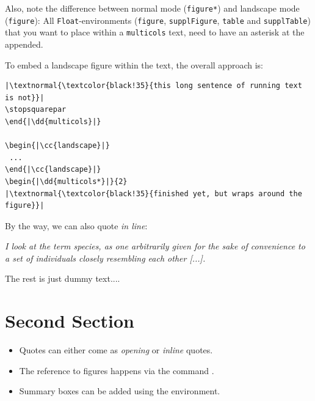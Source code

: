 \begin{multicols}{2}
Also, note the difference between normal mode (\texttt{figure*}) and landscape mode (\texttt{figure}):
All \texttt{Float}-environments (\texttt{figure}, \texttt{supplFigure}, \texttt{table} and \texttt{supplTable}) that you want to place within a \texttt{multicols} text, need to have an asterisk at the appended.

To embed a landscape figure within the text, the overall approach is:\vspace*{-.5em}

\coderule\vspace*{-.8em}
\begin{lstlisting}
|\textnormal{\textcolor{black!35}{this long sentence of running text is not}}|
\stopsquarepar
\end{|\dd{multicols}|}

\begin{|\cc{landscape}|}
 ...
\end{|\cc{landscape}|}
\begin{|\dd{multicols*}|}{2}
|\textnormal{\textcolor{black!35}{finished yet, but wraps around the figure}}|
\end{lstlisting}
\vspace*{-1.8em}
\coderule

By the way, we can also quote \textit{in line}:

\begin{displayquote}
\textit{
I look at the term species, as one arbitrarily given for the sake of convenience to a set of individuals closely resembling each other [...].}
\hfill{}
\end{displayquote}

The rest is just dummy text....

\lipsum[1]

\section{Second Section}

\lipsum[3]

\begin{tcolorbox}[arc=0pt,outer arc=0pt,breakable,title = Summary,
colback=clrt2!30,colframe=clrt2,pad at break=3mm,boxrule=1pt]
   \begin{itemize}[leftmargin=1em]
   \setlength{\itemsep}{0em}
    \item{Quotes can either come as \textit{opening} or \textit{inline} quotes.}
    \item{The reference to figures happens via the command .}
    \item{Summary boxes can be added using the  environment.}
\end{itemize}
\end{tcolorbox}

\end{multicols}
